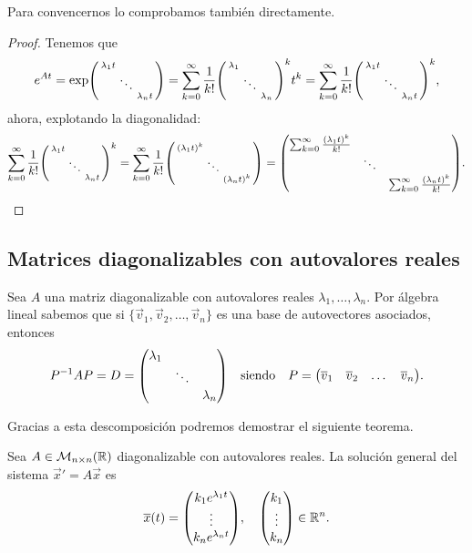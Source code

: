 \documentclass[../ecuaciones_diferenciales.tex]{subfiles}
\begin{document}
Para convencernos lo comprobamos también directamente.

\begin{proof}
	Tenemos que
	\[e^{At} = \exp\smat{\lambda_1t & & \\ & \ddots & \\ & & \lambda_nt}
		= \sum_{k = 0}^\infty
		\frac{1}{k!}\smat{\lambda_1 & & \\ & \ddots & \\ & & \lambda_n}^k t^k
		= \sum_{k = 0}^\infty
		\frac{1}{k!} \smat{\lambda_1 t & & \\ & \ddots & \\ & & \lambda_n t}^k,
	\]
	ahora, explotando la diagonalidad:
	\[\sum_{k = 0}^\infty \frac{1}{k!} 
			\smat{\lambda_1 t & & \\ & \ddots & \\ & & \lambda_n t}^k
		= \sum_{k = 0}^\infty \frac{1}{k!} 
			\smat{(\lambda_1 t)^k & & \\ & \ddots & \\ & & (\lambda_n t)^k}
		= \mat{\sum_{k = 0}^\infty \frac{(\lambda_1 t)^k}{k!} & & \\
			& \ddots &
			\\ & & \sum_{k = 0}^\infty \frac{(\lambda_n t)^k}{k!}}.\]
\end{proof}

\subsection{Matrices diagonalizables con autovalores reales}

Sea \(A\) una matriz diagonalizable con autovalores reales
\(\lambda_1, \dots, \lambda_n\). 
Por álgebra lineal sabemos que si \(\{\vec{v}_1, \vec{v}_2, \dots, \vec{v}_n\}\)
es una base de autovectores asociados, entonces
\[P^{-1} A P = D = \mat{\lambda_1 && \\ & \ddots & \\ && \lambda_n}
	\quad \text{siendo} \quad
	P = \mat{\vec{v}_1 & \vec{v}_2 & \dots & \vec{v}_n}.\]

Gracias a esta descomposición podremos demostrar el siguiente teorema.

\begin{proposition}
	Sea \(A \in \mathcal{M}_{n \times n}(\mathbb{R})\) diagonalizable con autovalores 
	reales. La solución general del sistema \(\vec{x}' = A\vec{x}\) es
	\[\vec{x}(t) = \mat{k_1 e^{\lambda_1 t} \\ \vdots \\ k_n e^{\lambda_n t}},
	\quad \mat{k_1 \\ \vdots \\ k_n} \in \R^n.\]
\end{proposition}
\end{document}
